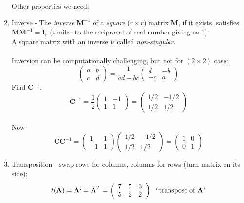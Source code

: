 \begin{enumerate}
Other properties we need:
\item Inverse -  The {\em inverse} $\textbf{M}^{-1}$ of a {\em square} ($r \times r$) matrix $\textbf{M}$,
if it exists, satisfies $\textbf{MM}^{-1}=\textbf{I}_r$ (similar to the reciprocal of real number giving us 1).\\
 A square matrix with an inverse is called {\em non-singular}.\\~\\
Inversion can be computationally challenging, but not for
$(2 \times 2)$ case:
$$ \left(\begin{array}{cc} a & b \\ c & d \end{array}\right) = 
\frac{1}{ad-bc}
\left(\begin{array}{cc} d & -b \\ -c & a \end{array}\right) $$
Find $\textbf{C}^{-1}$.
$$\textbf{C}^{-1} = \frac{1}{2}\left(\begin{array}{cc} 1 & -1 \\ 1 & 1\end{array}\right)=\left(\begin{array}{cc} 1/2 & -1/2 \\ 1/2 & 1/2\end{array}\right)$$~\\
Now 
$$\textbf{C}\textbf{C}^{-1}=\left(\begin{array}{cc} 1 & 1 \\ -1 & 1 \end{array}\right)\left(\begin{array}{cc} 1/2 & -1/2 \\ 1/2 & 1/2\end{array}\right)=\left(\begin{array}{cc} 1 & 0 \\ 0 & 1\end{array}\right)$$


\item Transposition - swap rows for columns, columns for rows (turn matrix on its side):
\[
t(\textbf{A}) = \textbf{A}` = \textbf{A}^{T} = 
\left(\begin{array}{ccc} 7 & 5 & 3 \\ 5 & 2 & 2 \end{array}\right) \ \ \mbox{``transpose of $\textbf{A}$"}
\]
\end{enumerate}
~\\

